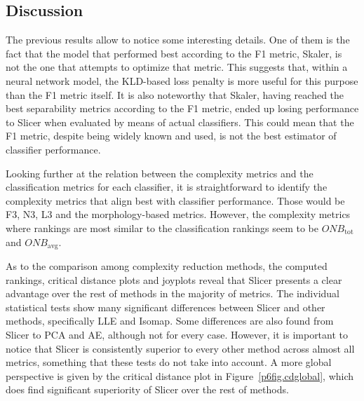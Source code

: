 \subsection{Discussion}
The previous results allow to notice some interesting details. One of them is the fact that the model that performed best according to the F1 metric, Skaler, is not the one that attempts to optimize that metric. This suggests that, within a neural network model, the KLD-based loss penalty is more useful for this purpose than the F1 metric itself. It is also noteworthy that Skaler, having reached the best separability metrics according to the F1 metric, ended up losing performance to Slicer when evaluated by means of actual classifiers. This could mean that the F1 metric, despite being widely known and used, is not the best estimator of classifier performance.

Looking further at the relation between the complexity metrics and the classification metrics for each classifier, it is straightforward to identify the complexity metrics that align best with classifier performance. Those would be F3, N3, L3 and the morphology-based metrics. However, the complexity metrics where rankings are most similar to the classification rankings seem to be $\textit{ONB}_{\text{tot}}$ and $\textit{ONB}_{\text{avg}}$. %

As to the comparison among complexity reduction methods, the computed rankings, critical distance plots and joyplots reveal that Slicer presents a clear advantage over the rest of methods in the majority of metrics. The individual statistical tests show many significant differences between Slicer and other methods, specifically LLE and Isomap. Some differences are also found from Slicer to PCA and AE, although not for every case. However, it is important to notice that Slicer is consistently superior to every other method across almost all metrics, something that these tests do not take into account. A more global perspective is given by the critical distance plot in Figure~\ref{p6fig.cdglobal}, which does find significant superiority of Slicer over the rest of methods.

